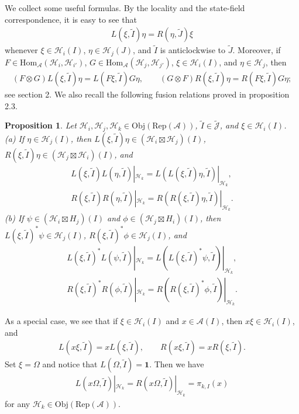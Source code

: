 \documentclass[12pt,a4paper]{article}
\theoremstyle{definition}
\theoremstyle{plain}
\newtheorem{pp}[df]{Proposition}
\newcommand{\mc}{\mathcal}
\newcommand{\wtd}{\widetilde}
\newcommand{\id}{\mathbf{1}}
\newcommand{\Hom}{\mathrm{Hom}}
\newcommand{\Jtd}{\widetilde{\mathcal J}}
\newcommand{\RepA}{\mathrm{Rep}(\mc A)}
\newcommand{\Obj}{\mathrm{Obj}}
\numberwithin{equation}{subsection}
\begin{document}
We collect some useful formulas. By the locality and the state-field correspondence, it is  easy to see that
\begin{align}
L(\xi,\wtd I)\eta=R(\eta,\wtd J)\xi
\end{align}
whenever $\xi\in\mc H_i(I)$, $\eta\in\mc H_j(J)$, and $\wtd I$ is anticlockwise to $\wtd J$. Moreover, if $F\in\Hom_{\mc A}(\mc H_i,\mc H_{i'})$, $G\in\Hom_{\mc A}(\mc H_j,\mc H_{j'})$,  $\xi\in\mc H_i(I)$, and $\eta\in\mc H_j$, then
\begin{align}
(F\otimes G)L(\xi,\wtd I)\eta=L(F\xi,\wtd I)G\eta,\qquad (G\otimes F)R(\xi,\wtd I)\eta=R(F\xi,\wtd I)G\eta;\label{eq14}
\end{align}
see \cite{Gui21b} section 2. We also recall the following fusion relations proved in \cite{Gui21b} proposition 2.3.
\begin{pp}\label{lb10}
	Let $\mc H_i,\mc H_j,\mc H_k\in\Obj(\RepA)$, $\wtd I\in\Jtd$, and $\xi\in\mc H_i(I)$.\\
	(a) If $\eta\in\mc H_j(I)$, then $L(\xi,\wtd I)\eta\in(\mc H_i\boxtimes\mc H_j)(I)$, $R(\xi,\wtd I)\eta\in(\mc H_j\boxtimes\mc H_i)(I)$, and
	\begin{gather}
	L(\xi,\wtd I)L(\eta,\wtd I)|_{\mc H_k}=L(L(\xi,\wtd I)\eta,\wtd I)|_{\mc H_k},\label{eq9}\\
	R(\xi,\wtd I)R(\eta,\wtd I)|_{\mc H_k}=R(R(\xi,\wtd I)\eta,\wtd I)|_{\mc H_k}.\label{eq10}
	\end{gather}
	(b) If $\psi\in(\mc H_i\boxtimes H_j)(I)$ and $\phi\in (\mc H_j\boxtimes H_i)(I)$, then $L(\xi,\wtd I)^*\psi\in\mc H_j(I)$, $R(\xi,\wtd I)^*\phi\in\mc H_j(I)$, and
	\begin{gather}
	L(\xi,\wtd I)^*L(\psi,\wtd I)|_{\mc H_k}=L(L(\xi,\wtd I)^*\psi,\wtd I)|_{\mc H_k},\label{eq11}\\
	R(\xi,\wtd I)^*R(\phi,\wtd I)|_{\mc H_k}=R(R(\xi,\wtd I)^*\phi,\wtd I)|_{\mc H_k}.\label{eq12}
	\end{gather}
\end{pp}
As a special case, we see that if $\xi\in\mc H_i(I)$ and $x\in\mc A(I)$, then $x\xi\in\mc H_i(I)$, and
\begin{gather}
L(x\xi,\wtd I)=xL(\xi,\wtd I),\qquad R(x\xi,\wtd I)=xR(\xi,\wtd I).\label{eq13}
\end{gather}
Set $\xi=\Omega$ and notice that $L(\Omega,\wtd I)=\id$. Then we have
\begin{align}
L(x\Omega,\wtd I)|_{\mc H_k}= R(x\Omega,\wtd I)|_{\mc H_k}=\pi_{k,I}(x)
\end{align}
for any $\mc H_k\in\Obj(\RepA)$.
\end{document}
